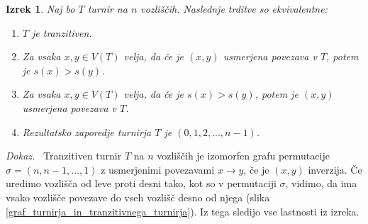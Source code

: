 \documentclass[a4paper, 12pt]{book}
\newtheorem{izrek}{Izrek}[chapter]
\newenvironment{dokaz}{\emph{Dokaz.}\ }{\hspace{\fill}{$\Box$}}
\begin{document}
\begin{izrek}
\label{izrek_tranzitiven_turnir}
    Naj bo $T$ turnir na $n$ vozliščih. Naslednje trditve so ekvivalentne:
    \begin{enumerate}
        \item $T$ je tranzitiven.
        \item Za vsaka $x,y \in V(T)$ velja, da če je $(x, y)$ usmerjena povezava v $T$, potem je $s(x) > s(y)$.
        \item Za vsaka $x,y \in V(T)$  velja, da če je $s(x) > s(y)$, potem je $(x, y)$ usmerjena povezava v $T$.
        \item Rezultatsko zaporedje turnirja $T$ je $(0, 1, 2, ..., n-1)$.
    \end{enumerate}
\end{izrek}
\begin{dokaz}
    Tranzitiven turnir $T$ na $n$ vozliščih je izomorfen grafu permutacije $\sigma = (n, n-1, ..., 1)$ z usmerjenimi povezavami $x \rightarrow y$, če je $(x, y)$ inverzija. Če uredimo vozlišča od leve proti desni tako, kot so v permutaciji $\sigma$, vidimo, da ima vsako vozlišče povezave do vseh vozlišč desno od njega (slika \ref{graf_turnirja_in_tranzitivnega_turnirja}). Iz tega sledijo vse lastnosti iz izreka.
\end{dokaz}
\end{document}
